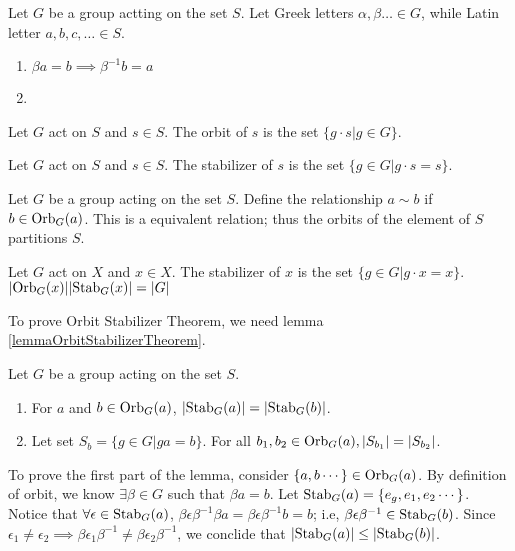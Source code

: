 \documentclass[../note.tex]{subfiles}
\begin{document}
\begin{theorem}
	Let $G$ be a group actting on the set $S$. Let Greek letters $\alpha, \beta \dots \in G$, while Latin letter $a,b,c, \dots \in S$.
	\begin{enumerate}
		\item $\beta a = b \implies \beta^{-1} b = a$ 
		\item 
	\end{enumerate}
\end{theorem}
\begin{definition}[Orbit]
	Let $G$ act on $S$ and $s \in S$. The orbit of $s$ is the set $\{g\cdot s | g \in G\}$.	
\end{definition}

\begin{definition}[Stabilizer]
	Let $G$ act on $S$ and $s \in S$. The stabilizer of $s$ is the set $\{g \in G | g\cdot s = s\}$.
\end{definition}

\begin{theorem}
	Let $G$ be a group acting on the set $S$.
	Define the relationship $a\sim b$ if $b\in \text{Orb}_{G}({a})$.
	This is a equivalent relation; thus the orbits of the element of $S$ partitions $S$.
\end{theorem}

\begin{theorem}
	Let $G$ act on $X$ and $x \in X$. The stabilizer of $x$ is the set $\{g \in G | g\cdot x = x\}$.
	$|\text{Orb}_{G}({x})||\text{Stab}_{G}({x})|=|G|$
\end{theorem}

To prove Orbit Stabilizer Theorem, we need lemma \ref{lemmaOrbitStabilizerTheorem}.

\begin{lemma}\label{lemmaOrbitStabilizerTheorem}
	Let $G$ be a group acting on the set $S$.
\begin{enumerate}
	\item For $a$ and $b\in \text{Orb}_{G}({a})$, $|\text{Stab}_{G}({a})|=|\text{Stab}_{G}({b})|$.
	\item Let set $S_b=\{g\in G| ga=b \}$. For all $b_1, b_2 \in \text{Orb}_{G}({a}), |S_{b_1}|=|S_{b_2}|$.
\end{enumerate}
\end{lemma}

To prove the first part of the lemma, consider $\{a,b \cdots\}\in \text{Orb}_{G}({a})$. By definition of orbit, we know $\exists \beta \in G $ such that $\beta a = b$.
Let $\text{Stab}_{G}({a}) = \{e_g, e_1, e_2 \cdots\}$. Notice that $\forall \epsilon \in \text{Stab}_{G}({a})$, $\beta \epsilon \beta^{-1} \beta a = \beta \epsilon \beta^{-1} b = b$; i.e, $\beta \epsilon \beta^{-1} \in \text{Stab}_{G}({b})$. 
Since $\epsilon_1 \neq \epsilon_2 \implies \beta \epsilon_1 \beta^{-1} \neq \beta \epsilon_2 \beta ^{-1}$, we conclide that $|\text{Stab}_{G}({a})| \leq |\text{Stab}_{G}({b})| $.
\end{document}
